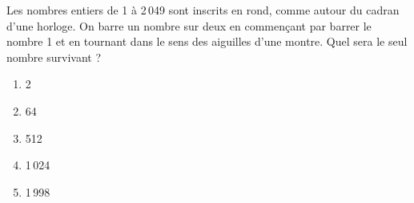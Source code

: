 Les nombres entiers de 1 à 2\,049 sont inscrits en rond, comme autour
du cadran d'une horloge. On barre un nombre sur deux en commençant par
barrer le nombre 1 et en tournant dans le sens des aiguilles d'une
montre. Quel sera le seul nombre survivant ?
\begin{multicols}{5}
  \begin{enumerate}[A/]
  \item 2
  \item 64
  \item 512
  \item 1\,024
  \item 1\,998
  \end{enumerate}
\end{multicols}